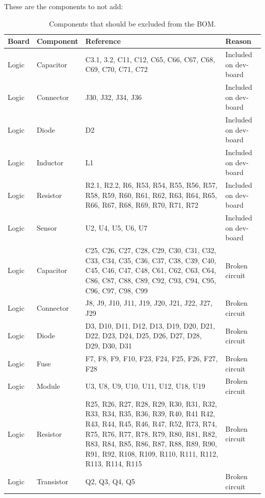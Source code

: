 \documentclass[ti,oneside,10pt]{uantwerpenreport}
\begin{document}
These are the components to not add:
\begin{table}[h!]
    \centering
    \caption{Components that should be excluded from the BOM.}
    \begin{tabular}{p{1cm} p{2.2cm} p{7cm} p{3.5cm}}
        \toprule
            \textbf{Board} & \textbf{Component} & \textbf{Reference} & \textbf{Reason} \\
        \midrule
            Logic   & Capacitor   & C3.1, 3.2, C11, C12, C65, C66, C67, C68, C69, C70, C71, C72 & Included on dev-board \\
            Logic   & Connector   & J30, J32, J34, J36 & Included on dev-board \\
            Logic   & Diode       & D2 & Included on dev-board \\
            Logic   & Inductor    & L1 & Included on dev-board \\
            Logic   & Resistor    & R2.1, R2.2, R6, R53, R54, R55, R56, R57, R58, R59, R60, R61, R62, R63, R64, R65, R66, R67, R68, R69, R70, R71, R72 & Included on dev-board \\
            Logic   & Sensor      & U2, U4, U5, U6, U7 & Included on dev-board \\
        \midrule
            Logic   & Capacitor   & C25, C26, C27, C28, C29, C30, C31, C32, C33, C34, C35, C36, C37, C38, C39, C40, C45, C46, C47, C48, C61, C62, C63, C64, C86, C87, C88, C89, C92, C93, C94, C95, C96, C97, C98, C99 & Broken circuit \\
            Logic   & Connector   & J8, J9, J10, J11, J19, J20, J21, J22, J27, J29 & Broken circuit \\
            Logic   & Diode       & D3, D10, D11, D12, D13, D19, D20, D21, D22, D23, D24, D25, D26, D27, D28, D29, D30, D31 & Broken circuit \\
            Logic   & Fuse        & F7, F8, F9, F10, F23, F24, F25, F26, F27, F28 & Broken circuit \\
            Logic   & Module      & U3, U8, U9, U10, U11, U12, U18, U19 & Broken circuit \\
            Logic   & Resistor    & R25, R26, R27, R28, R29, R30, R31, R32, R33, R34, R35, R36, R39, R40, R41 R42, R43, R44, R45, R46, R47, R52, R73, R74, R75, R76, R77, R78, R79, R80, R81, R82, R83, R84, R85, R86, R87, R88, R89, R90, R91, R92, R108, R109, R110, R111, R112, R113, R114, R115 & Broken circuit \\
            Logic   & Transistor  & Q2, Q3, Q4, Q5 & Broken circuit \\

\end{tabular}
\end{table}
\end{document}
